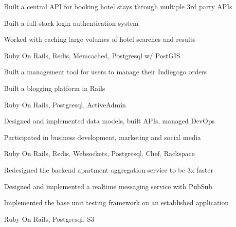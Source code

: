 \documentclass[]{modern}
\begin{document}
\begin{minipage}[t]{0.66\textwidth}

\begin{tightemize}
\item Built a central API for booking hotel stays through multiple 3rd party APIs
\item Built a full-stack login authentication system
\item Worked with caching large volumes of hotel searches and results
\item Ruby On Rails, Redis, Memcached, Postgresql w/ PostGIS
\end{tightemize}
\sectionsep


\begin{tightemize}
\item Built a management tool for users to manage their Indiegogo orders
\item Built a blogging platform in Rails
\item Ruby On Rails, Postgresql, ActiveAdmin
\end{tightemize}
\sectionsep


\begin{tightemize}
\item Designed and implemented data models, built APIs, managed DevOps
\item Participated in business development, marketing and social media
\item Ruby On Rails, Redis, Websockets, Postgresql, Chef, Rackspace
\end{tightemize}
\sectionsep


\begin{tightemize}
\item Redesigned the backend apartment aggregation service to be 3x faster
\item Designed and implemented a realtime messaging service with PubSub
\item Implemented the base unit testing framework on an established application
\item Ruby On Rails, Postgresql, S3
\end{tightemize}
\sectionsep


\end{minipage}
\end{document}

